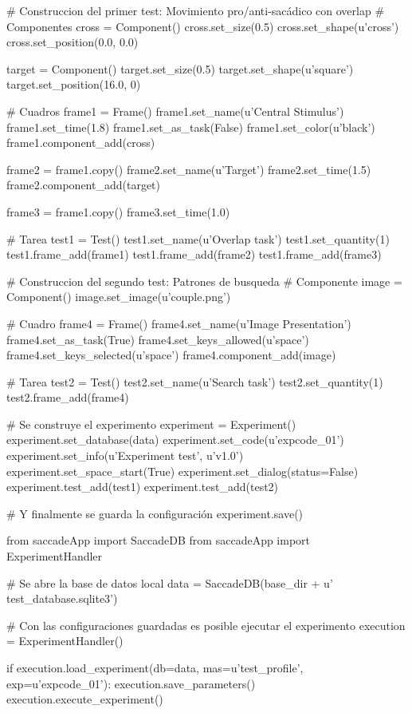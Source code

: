 \documentclass[\main/main.tex]{subfiles}
\begin{document}
	\begin{python}[caption=Crear un nuevo experimento., captionpos=b, label=alg:04_new_exp]
	# Construccion del primer test: Movimiento pro/anti-sacádico  con overlap
    # Componentes
    cross = Component()
    cross.set_size(0.5)
    cross.set_shape(u'cross')
    cross.set_position(0.0, 0.0)

    target = Component()
    target.set_size(0.5)
    target.set_shape(u'square')
    target.set_position(16.0, 0)

    # Cuadros
    frame1 = Frame()
    frame1.set_name(u'Central Stimulus')
    frame1.set_time(1.8)
    frame1.set_as_task(False)
    frame1.set_color(u'black')
    frame1.component_add(cross)

    frame2 = frame1.copy()
    frame2.set_name(u'Target')
    frame2.set_time(1.5)
    frame2.component_add(target)

    frame3 = frame1.copy()
    frame3.set_time(1.0)

    # Tarea
    test1 = Test()
    test1.set_name(u'Overlap task')
    test1.set_quantity(1)
    test1.frame_add(frame1)
    test1.frame_add(frame2)
    test1.frame_add(frame3)

    # Construccion del segundo test: Patrones de busqueda
    # Componente
    image = Component()
    image.set_image(u'couple.png')

    # Cuadro
    frame4 = Frame()
    frame4.set_name(u'Image Presentation')
    frame4.set_as_task(True)
    frame4.set_keys_allowed(u'space')
    frame4.set_keys_selected(u'space')
    frame4.component_add(image)

    # Tarea
    test2 = Test()
    test2.set_name(u'Search task')
    test2.set_quantity(1)
    test2.frame_add(frame4)

    # Se construye el experimento
    experiment = Experiment()
    experiment.set_database(data)
    experiment.set_code(u'expcode_01')
    experiment.set_info(u'Experiment test', u'v1.0')
    experiment.set_space_start(True)
    experiment.set_dialog(status=False)
    experiment.test_add(test1)
    experiment.test_add(test2)

    # Y finalmente se guarda la configuración
    experiment.save()

	\end{python}

	
	\begin{python}[caption=Crear un nuevo experimento., captionpos=b, label=alg:04_new_exp]
	from saccadeApp import SaccadeDB
	from saccadeApp import ExperimentHandler

	# Se abre la base de datos local
    data = SaccadeDB(base_dir + u'\\test_database.sqlite3')

    # Con las configuraciones guardadas es posible ejecutar el experimento
    execution = ExperimentHandler()

    if execution.load_experiment(db=data, mas=u'test_profile', exp=u'expcode_01'):
        execution.save_parameters()
        execution.execute_experiment()

	\end{python}
\end{document}

